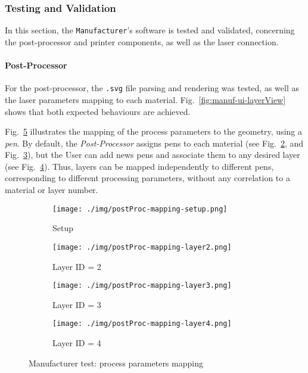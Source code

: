 %

\subsubsection{Testing and Validation}%
\label{sec:testing-validation-manuf}
In this section, the \texttt{Manufacturer}'s software is tested and validated,
concerning the post-processor and printer components, as well as the laser
connection.

\paragraph{Post-Processor}
For the
post-processor, the \texttt{.svg} file parsing and rendering was tested, as well
as the laser parameters mapping to each material.
Fig.~\ref{fig:manuf-ui-layerView} shows that both expected behaviours are
achieved.

Fig.~\ref{fig:manuf-test-procParams-map} illustrates the mapping of the process
parameters to the geometry, using a \emph{pen}. By default, the
\emph{Post-Processor} assigns pens to each material (see
Fig.~\ref{fig:postProc-mapping-layer2}, and
Fig.~\ref{fig:postProc-mapping-layer3}), but the User can add news pens and
associate them to any desired layer (see
Fig.~\ref{fig:postProc-mapping-layer4}).
Thus, layers can be mapped
independently to different pens, corresponding to different processing
parameters, without any correlation to a material or layer number.

\begin{figure}[htbp!]
  \centering
  \begin{subfigure}[t]{0.48\textwidth}
  \centering
  \texttt{[image: ./img/postProc-mapping-setup.png]}
  \caption{Setup}%
  \label{fig:postProc-mapping-setup}
  \end{subfigure}
%
  \begin{subfigure}[t]{0.48\textwidth}
  \centering
  \texttt{[image: ./img/postProc-mapping-layer2.png]}
  \caption{Layer ID = 2}%
  \label{fig:postProc-mapping-layer2}
  \end{subfigure}
%
  \begin{subfigure}[t]{0.48\textwidth}
  \centering
  \texttt{[image: ./img/postProc-mapping-layer3.png]}
  \caption{Layer ID = 3}%
  \label{fig:postProc-mapping-layer3}
  \end{subfigure}
%
  \begin{subfigure}[t]{0.48\textwidth}
  \centering
  \texttt{[image: ./img/postProc-mapping-layer4.png]}
  \caption{Layer ID = 4}%
  \label{fig:postProc-mapping-layer4}
  \end{subfigure}
  \caption{Manufacturer test: process parameters mapping}%
  \label{fig:manuf-test-procParams-map}
\end{figure}

